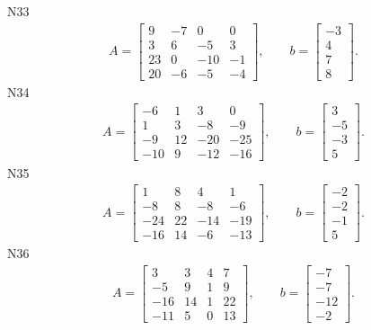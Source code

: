 \documentclass[11pt]{report}
\begin{document}
N33
\begin{align*}
 A = \left[\begin{matrix}9 & -7 & 0 & 0\\3 & 6 & -5 & 3\\23 & 0 & -10 & -1\\20 & -6 & -5 & -4\end{matrix}\right],
\qquad b = \left[\begin{matrix}-3\\4\\7\\8\end{matrix}\right]. 
 \end{align*}
N34
\begin{align*}
 A = \left[\begin{matrix}-6 & 1 & 3 & 0\\1 & 3 & -8 & -9\\-9 & 12 & -20 & -25\\-10 & 9 & -12 & -16\end{matrix}\right],
\qquad b = \left[\begin{matrix}3\\-5\\-3\\5\end{matrix}\right]. 
 \end{align*}
N35
\begin{align*}
 A = \left[\begin{matrix}1 & 8 & 4 & 1\\-8 & 8 & -8 & -6\\-24 & 22 & -14 & -19\\-16 & 14 & -6 & -13\end{matrix}\right],
\qquad b = \left[\begin{matrix}-2\\-2\\-1\\5\end{matrix}\right]. 
 \end{align*}
N36
\begin{align*}
 A = \left[\begin{matrix}3 & 3 & 4 & 7\\-5 & 9 & 1 & 9\\-16 & 14 & 1 & 22\\-11 & 5 & 0 & 13\end{matrix}\right],
\qquad b = \left[\begin{matrix}-7\\-7\\-12\\-2\end{matrix}\right]. 
 \end{align*}
\end{document}
